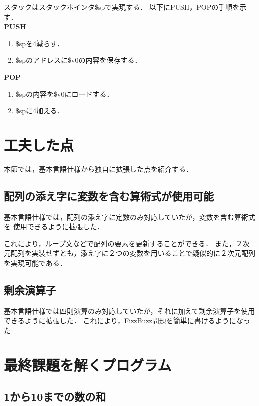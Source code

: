 \documentclass[11pt]{jarticle}
\begin{document}
スタックはスタックポインタ\$spで実現する．
以下にPUSH，POPの手順を示す．\\

\textbf{PUSH}

\begin{enumerate}
    \item \$spを4減らす．
    \item \$spのアドレスに\$v0の内容を保存する．
\end{enumerate}

\textbf{POP}

\begin{enumerate}
    \item \$spの内容を\$v0にロードする．
    \item \$spに4加える．
\end{enumerate}

\section{工夫した点}

本節では，基本言語仕様から独自に拡張した点を紹介する．

\subsection{配列の添え字に変数を含む算術式が使用可能}

基本言語仕様では，配列の添え字に定数のみ対応していたが，変数を含む算術式を
使用できるように拡張した．

これにより，ループ文などで配列の要素を更新することができる．
また，２次元配列を実装せずとも，添え字に２つの変数を用いることで疑似的に２次元配列を実現可能である．

\subsection{剰余演算子}

基本言語仕様では四則演算のみ対応していたが，それに加えて剰余演算子を使用できるように拡張した．
これにより，FizzBuzz問題を簡単に書けるようになった

\section{最終課題を解くプログラム}

\subsection{1から10までの数の和}
\end{document}
